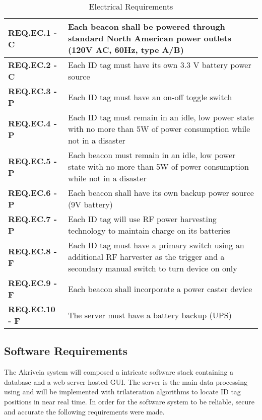 \bgroup
\def\arraystretch{1.5}
\begin{table}[H]
\centering
\begin{tabular}{ | m{3.25cm} | m{12.5cm} |} 
 \hline
 \textbf{REQ.EC.1 - C} & Each beacon shall be powered through standard North American power outlets (120V AC, 60Hz, type A/B) \\ 
\hline
 \textbf{REQ.EC.2 - C} & Each ID tag must have its own 3.3 V battery power source \\ 
\hline
 \textbf{REQ.EC.3 - P} & Each ID tag must have an on-off toggle switch  \\ 
\hline
 \textbf{REQ.EC.4 - P} &  Each ID tag must remain in an idle, low power state with no more than 5W of power consumption while not in a disaster  \\
\hline
 \textbf{REQ.EC.5 - P} &  Each beacon must remain in an idle, low power state with no more than 5W of power consumption while not in a disaster \\
\hline
 \textbf{REQ.EC.6 - P} & Each beacon shall have its own backup power source (9V battery)  \\
\hline
 \textbf{REQ.EC.7 - P} & Each ID tag will use RF power harvesting technology to maintain charge on its batteries \\
\hline
 \textbf{REQ.EC.8 - F} &  Each ID tag must have a primary switch using an additional RF harvester as the trigger and a secondary manual switch to turn device on only   \\
\hline
 \textbf{REQ.EC.9 - F} & Each beacon shall incorporate a power caster device \\
\hline
 \textbf{REQ.EC.10 - F} & The server must have a battery backup (UPS) \\
\hline
\end{tabular}
\caption{Electrical Requirements}
\end{table}	

\break
\subsection{Software Requirements}
The Akriveia system will composed a intricate software stack containing a database and a web server hosted GUI. The server is the main data processing using and will be implemented with trilateration algorithms to locate ID tag positions in near real time. In order for the software system to be reliable, secure and accurate the following requirements were made.

\bigskip

